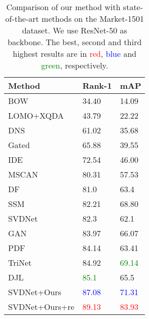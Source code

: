 \documentclass[10pt,twocolumn,letterpaper]{article}
\begin{document}
\begin{table}
\small
\begin{center}
\begin{tabularx}{\linewidth}{ l|C|C }
\hline
Method & Rank-1 & mAP \\
\hline
\hline
{BOW}  \cite{zheng2015scalable}  & 34.40 & 14.09 \\
LOMO+XQDA \cite{liao2015lomo} & 43.79 & 22.22 \\
DNS \cite{zhang2016learningDNS}  & 61.02 & 35.68 \\
Gated \cite{varior2016gated}  & 65.88 & 39.55 \\
IDE \cite{reid-survey} & 72.54 & 46.00\\
MSCAN \cite{li2017learning} & 80.31 & 57.53\\
DF \cite{zhao2017deeply} & 81.0 & 63.4 \\
SSM \cite{bai2017scalable} & 82.21 & 68.80 \\
{SVDNet} \cite{sun2017svdnet} & 82.3 & 62.1 \\
{GAN} \cite{zheng2017unlabeled} & 83.97 & 66.07 \\
PDF \cite{su2017pose}  & 84.14 & 63.41 \\
TriNet \cite{hermans2017defense} & 84.92 & \textcolor{green}{69.14} \\
DJL \cite{li2017person} & \textcolor{green}{85.1} & 65.5\\
\hline
\hline
SVDNet+Ours&  \textcolor{blue}{87.08}& \textcolor{blue}{71.31} \\
SVDNet+Ours+re \cite{zhong2017re}& \textcolor{red}{89.13}& \textcolor{red}{83.93}\\
\hline
\end{tabularx}
\end{center}
\vspace{-.1in}
\caption{\label{tabel:Market-state} Comparison of our method with state-of-the-art methods on the Market-1501 dataset. We use ResNet-50 as backbone. The best, second and third
highest results are in \textcolor{red}{red}, \textcolor{blue}{blue} and \textcolor{green}{green}, respectively.}
\end{table}
\end{document}

